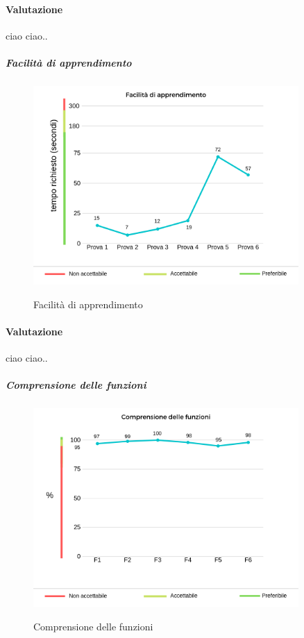 	\paragraph*{Valutazione} ciao ciao..
	\pagebreak
	\subparagraph{Facilità di apprendimento}
	\begin{center}
		\begin{figure}[h] 
			\centering 
			\includegraphics[width=0.90\textwidth]{res/images/new/facilitaApprendimento.png}\\
			\caption{Facilità di apprendimento}
		\end{figure}
	\end{center}
	\paragraph*{Valutazione} ciao ciao..
	\pagebreak
	\subparagraph{Comprensione delle funzioni}
	\begin{center}
		\begin{figure}[h] 
			\centering 
			\includegraphics[width=0.90\textwidth]{res/images/new/comprensioneFunzioni.png}\\
			\caption{Comprensione delle funzioni}
		\end{figure}
	\end{center}
